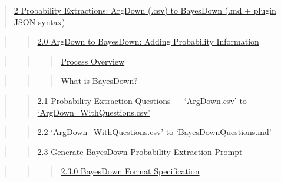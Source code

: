 \documentclass[
  11pt,
  letterpaper,
]{book}
\begin{document}
\begin{quote}
\hyperref[scrollTo=7SGB0XMp5VFqux26uniqifier=1]{2 Probability
Extractions: ArgDown (.csv) to BayesDown (.md + plugin JSON syntax)}
\end{quote}

\begin{quote}
\begin{quote}
\hyperref[scrollTo=hWkmySZYNtzSux26uniqifier=1]{2.0 ArgDown to
BayesDown: Adding Probability Information}
\end{quote}
\end{quote}

\begin{quote}
\begin{quote}
\begin{quote}
\hyperref[scrollTo=hWkmySZYNtzSux26uniqifier=1]{Process Overview}
\end{quote}
\end{quote}
\end{quote}

\begin{quote}
\begin{quote}
\begin{quote}
\hyperref[scrollTo=hWkmySZYNtzSux26uniqifier=1]{What is BayesDown?}
\end{quote}
\end{quote}
\end{quote}

\begin{quote}
\begin{quote}
\hyperref[scrollTo=WcF2nHXBZru4ux26uniqifier=1]{2.1 Probability
Extraction Questions --- `ArgDown.csv' to `ArgDown\_WithQuestions.csv'}
\end{quote}
\end{quote}

\begin{quote}
\begin{quote}
\hyperref[scrollTo=-q9UOQ8yaBZnux26uniqifier=1]{2.2
`ArgDown\_WithQuestions.csv' to `BayesDownQuestions.md'}
\end{quote}
\end{quote}

\begin{quote}
\begin{quote}
\hyperref[scrollTo=Ux4OUCPue6Buux26uniqifier=1]{2.3 Generate BayesDown
Probability Extraction Prompt}
\end{quote}
\end{quote}

\begin{quote}
\begin{quote}
\begin{quote}
\hyperref[scrollTo=ivcnd2ml41Nvux26uniqifier=1]{2.3.0 BayesDown Format
Specification}
\end{quote}
\end{quote}
\end{quote}
\end{document}
